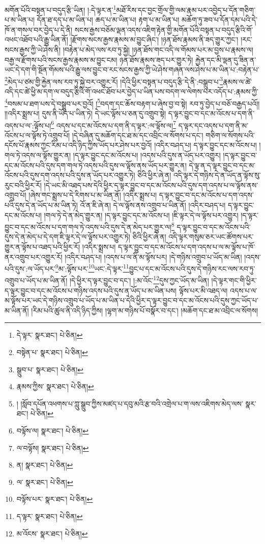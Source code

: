 མགོན་པོའི་བསྟན་པ་བདུད་རྩི་ཡིན། །:དེ་ལྟར་ན་\footnote{དེ་ལྟར་  སྣར་ཐང་།  པེ་ཅིན། }མཐོ་རིས་དང་བྱང་གྲོལ་གྱི་ལམ་རྣམ་པར་འབྱེད་པ་དོན་གཅིག་པ་མ་ཡིན་པ། དོན་ཐ་དད་པ་མ་ཡིན་པ། ཆད་པ་མ་ཡིན་པ། རྟག་པ་མ་ཡིན་པ། མཆོག་ཏུ་ཟབ་པ་དོན་དམ་པའི་དེ་ཁོ་ན་གསལ་བར་བྱེད་པ་དེ་ནི། སངས་རྒྱས་བཅོམ་ལྡན་འདས་འཇིག་རྟེན་གྱི་མགོན་པོའི་བསྟན་པ་བདུད་རྩིའི་གོ་འཕང་འཐོབ་པའི་རྒྱུ་ཡིན་ནོ། །རྫོགས་སངས་རྒྱས་རྣམས་མ་བྱུང་ཞིང་། །ཉན་ཐོས་རྣམས་ནི་ཟད་གྱུར་ཀྱང་། །རང་སངས་རྒྱས་ཀྱི་ཡེ་ཤེས་ནི། །བརྟེན་པ་མེད་ལས་རབ་ཏུ་སྐྱེ། །ཉན་ཐོས་གང་འདི་ལ་གོམས་པར་མ་བྱས་པ་རྣམས་ལ། བརྒྱ་ལ་རྫོགས་པའི་སངས་རྒྱས་རྣམས་མ་བྱུང་ངམ། ཉན་ཐོས་རྣམས་ཟད་པར་གྱུར་ཏེ། རྐྱེན་དང་མི་ལྡན་དུ་ཟིན་ན་ཡང་དེ་དག་གི་སྔོན་གོམས་པའི་རྒྱུ་ལས་བྱུང་བ་རང་སངས་རྒྱས་ཀྱི་ཡེ་ཤེས་གཞན་ལས་ཤེས་པ་མ་ཡིན་པ་:བརྟེན་པ་\footnote{བསྟེན་པ་  སྣར་ཐང་།  པེ་ཅིན། }མེད་པ་ཙམ་གྱི་རྐྱེན་ལས་རབ་ཏུ་སྐྱེ་བར་འགྱུར་རོ། །དེའི་ཕྱིར་བསྟན་པ་བདུད་རྩི་དེ་ནི་:བསྒྲུབ་པ་\footnote{སྒྲུབ་པ་  སྣར་ཐང་།  པེ་ཅིན། }རྣམས་ལ་ཚེ་འདི་དང་ཚེ་ཕྱི་མ་དག་ལ་བདུད་རྩིའི་གོ་འཕང་ཐོབ་པར་བྱེད་པ་ཡིན་པས་བདག་ལ་ལེགས་པར་འདོད་པ་:རྣམས་ཀྱི་\footnote{རྣམས་ཀྱིས་  སྣར་ཐང་།  པེ་ཅིན། }བསམ་པ་ཐག་པས་དེ་བསྒྲུབ་པར་བྱའོ། །\footnote{། །སློབ་དཔོན་འཕགས་པ་ཀླུ་སྒྲུབ་ཀྱིས་མཛད་པ་དབུ་མའི་རྩ་བའི་འགྲེལ་པ་ག་ལས་འཇིགས་མེད་ལས་  སྣར་ཐང་།  པེ་ཅིན། }བདག་དང་ཆོས་བརྟག་པ་ཞེས་བྱ་བ་སྟེ། རབ་ཏུ་བྱེད་པ་བཅོ་བརྒྱད་པའོ།། །།འདིར་སྨྲས་པ། དུས་ནི་ཡོད་པ་ཡིན་ཏེ། དེ་ཡང་ལྟོས་པ་ཅན་དུ་འགྲུབ་སྟེ། ད་ལྟར་བྱུང་བ་དང་མ་འོངས་པ་དག་ནི་འདས་པ་ལ་:ལྟོས་པ།\footnote{བལྟོས་ལ།  སྣར་ཐང་།  པེ་ཅིན། } འདས་པ་དང་མ་འོངས་པ་དག་ནི་ད་ལྟར་:ལ་ལྟོས་ལ།\footnote{ལ་བལྟོས།  སྣར་ཐང་།  པེ་ཅིན། } ད་ལྟར་དང་འདས་པ་དག་ནི་མ་འོངས་པ་ལ་ལྟོས་ཏེ་འགྲུབ་པོ། །དེ་བཞིན་དུ་མཆོག་དང་ཐ་མ་དང་འབྲིང་ལ་སོགས་པ་དང་། གཅིག་ལ་སོགས་པའི་དངོས་པོ་རྣམས་ཀྱང་རིམ་པ་འདི་ཉིད་ཀྱིས་ཡོད་པར་ཤེས་པར་བྱའོ། །འདིར་བཤད་པ། ད་ལྟར་བྱུང་དང་མ་འོངས་པ། །གལ་ཏེ་འདས་ལ་ལྟོས་གྱུར་ན། །ད་ལྟར་བྱུང་དང་མ་འོངས་པ། །འདས་པའི་དུས་ན་ཡོད་པར་འགྱུར། །ད་ལྟར་བྱུང་བ་དང་མ་འོངས་པའི་དུས་དག་གལ་ཏེ་འདས་པའི་དུས་ལ་ལྟོས་ནས་ཡོད་པར་གྱུར་ན། དེ་ལྟ་ན་ད་ལྟར་བྱུང་བ་དང་མ་འོངས་པའི་དུས་དག་འདས་པའི་དུས་ན་ཡོད་པར་འགྱུར་ཏེ། ཅིའི་ཕྱིར་ཞེ་ན། འདི་ལྟར་དེ་གཉིས་དེ་ན་ཡོད་ན་ལྟོས་སུ་རུང་བའི་ཕྱིར་རོ། །དེ་ཡང་མི་འཐད་པས་དེའི་ཕྱིར་ད་ལྟར་བྱུང་བ་དང་མ་འོངས་པའི་དུས་དག་འདས་པ་ལ་ལྟོས་ནས་འགྲུབ་པོ། །ཞེས་གང་སྨྲས་པ་དེ་རིགས་པ་མ་ཡིན་ནོ། །འདིར་སྨྲས་པ། ད་ལྟར་བྱུང་བ་དང་མ་འོངས་པ་དག་འདས་པའི་དུས་དེ་ན་ཡོད་པ་མ་ཡིན་ཏེ། འོ་ན་ཇི་ཞེ་ན། དེ་ལ་ལྟོས་ནས་འགྲུབ་པ་ཡིན་ནོ། །འདིར་བཤད་པ། ད་ལྟར་བྱུང་དང་མ་འོངས་པ། །གལ་ཏེ་དེ་ན་མེད་གྱུར་ན། །ད་ལྟར་བྱུང་དང་མ་འོངས་པ། །ཇི་ལྟར་དེ་ལ་ལྟོས་པར་འགྱུར། །ད་ལྟར་བྱུང་བ་དང་མ་འོངས་པ་དག་གལ་ཏེ་འདས་པའི་དུས་དེ་ན་མེད་པར་གྱུར་ལ།\footnote{ན།  སྣར་ཐང་།  པེ་ཅིན། } ད་ལྟར་བྱུང་བ་དང་མ་འོངས་པའི་དུས་དེ་ན་མེད་པ་དེ་དག་ཇི་ལྟར་དེ་ལ་ལྟོས་པར་འགྱུར་ཏེ། ཅིའི་ཕྱིར་ཞེ་ན། འདི་ལྟར་གསུམ་ཅར་ཡང་ཚོགས་པར་གྱུར་ན་ལྟོས་པ་འཐད་པའི་ཕྱིར་རོ། །འདིར་སྨྲས་པ། ད་ལྟར་བྱུང་བ་དང་མ་འོངས་པ་དག་འདས་པ་ལ་མ་ལྟོས་པ་ཁོ་ནར་འགྲུབ་པར་འགྱུར་རོ། །འདིར་བཤད་པ། །འདས་པ་ལ་ནི་མ་ལྟོས་པར། །དེ་གཉིས་འགྲུབ་པ་ཡོད་མ་ཡིན། །འདས་པའི་དུས་:ལ་ཡོད་པར་\footnote{ལ་  སྣར་ཐང་།  པེ་ཅིན། }མ་:ལྟོས་པར་\footnote{བལྟོས་པར་  སྣར་ཐང་།  པེ་ཅིན། }ཡང་:དེ་ལྟར་\footnote{ད་ལྟར་  སྣར་ཐང་།  པེ་ཅིན། }བྱུང་པ་དང་མ་འོངས་པའི་དུས་དེ་གཉིས་རང་ལས་རབ་ཏུ་འགྲུབ་པ་ཡོད་པ་མ་ཡིན་ནོ། །དེ་ཕྱིར་ད་ལྟར་བྱུང་བ་དང་། །:མ་འོང་\footnote{མ་འོངས་  སྣར་ཐང་།  པེ་ཅིན། }དུས་ཀྱང་ཡོད་མ་ཡིན། །དེ་ལྟར་གང་གི་ཕྱིར་ད་ལྟར་བྱུང་བ་དང་མ་འོངས་པ་གཉིས་འདས་པའི་དུས་ན་ཡོད་པ་མ་ཡིན་པས། ལྟོས་པར་མི་འཐད་ལ། འདས་པ་ལ་མ་ལྟོས་པར་ཡང་དེ་གཉིས་འགྲུབ་པ་ཡོད་པ་མ་ཡིན་པ་དེའི་ཕྱིར་ད་ལྟར་བྱུང་བ་དང་མ་འོངས་པའི་དུས་ཀྱང་ཡོད་པ་མ་ཡིན་ནོ། །རིམ་པའི་ཚུལ་ནི་འདི་ཉིད་ཀྱིས། །ལྷག་མ་གཉིས་པོ་བསྣོར་བ་དང་། །མཆོག་དང་ཐ་མ་འབྲིང་ལ་སོགས། 